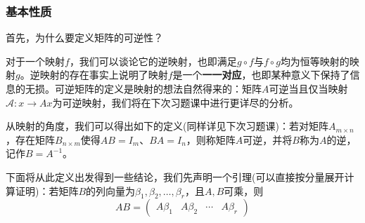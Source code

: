 \documentclass[a4paper,UTF8,fontset=windows]{ctexart}
\begin{document}
\subsubsection{基本性质}
首先，为什么要定义矩阵的可逆性？

对于一个映射$f$，我们可以谈论它的逆映射，也即满足$g\circ f$与$f\circ g$均为恒等映射的映射$g$。逆映射的存在事实上说明了映射$f$是一个\textbf{一一对应}，也即某种意义下保持了信息的无损。可逆矩阵的定义是映射的想法自然得来的：矩阵$A$可逆当且仅当映射$\mathcal{A}:x\to Ax$为可逆映射，我们将在下次习题课中进行更详尽的分析。

从映射的角度，我们可以得出如下的定义(同样详见下次习题课)：若对矩阵$A_{m\times n}$，存在矩阵$B_{n\times m}$使得$AB=I_m$、$BA=I_n$，则称矩阵$A$可逆，并将$B$称为$A$的逆，记作$B=A^{-1}$。

下面将从此定义出发得到一些结论，我们先声明一个引理(可以直接按分量展开计算证明)：若矩阵$B$的列向量为$\beta_1,\beta_2,\dots,\beta_r$，且$A,B$可乘，则
$$AB=\begin{pmatrix}A\beta_1&A\beta_2&\cdots&A\beta_r\end{pmatrix}$$
\end{document}
